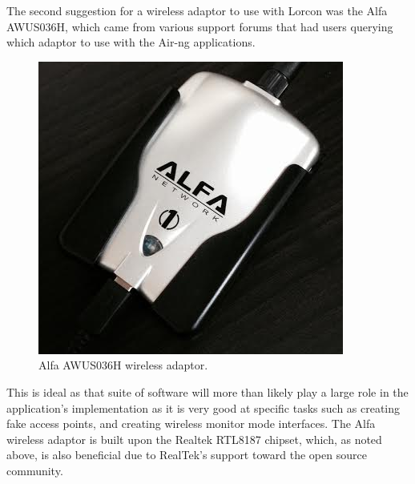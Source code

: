 The second suggestion for a wireless adaptor to use with Lorcon was the Alfa AWUS036H, which came from various support forums that had users querying which adaptor to use with the Air-ng applications.  

\begin{figure}[h!]
\centering\includegraphics{research/figures/alfa.png}
\caption{Alfa AWUS036H wireless adaptor.}
\end{figure}
\newpage
This is ideal as that suite of software will more than likely play a large role in the application's implementation as it is very good at specific tasks such as creating fake access points, and creating wireless monitor mode interfaces. The Alfa wireless adaptor is built upon the Realtek RTL8187 chipset, which, as noted above, is also beneficial due to RealTek's support toward the open source community.
